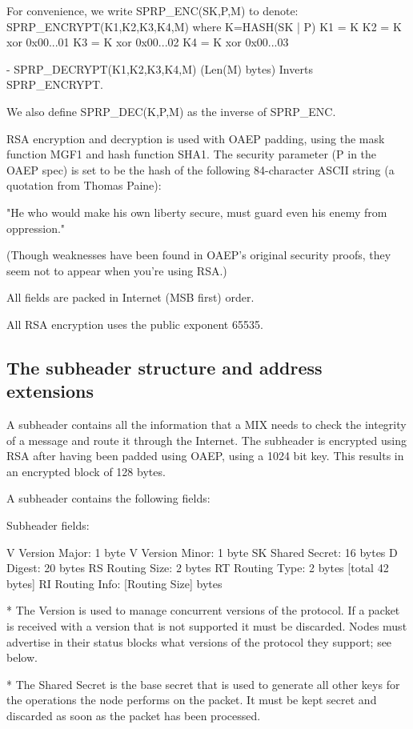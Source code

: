   For convenience, we write SPRP_ENC(SK,P,M) to denote:
       SPRP_ENCRYPT(K1,K2,K3,K4,M)
       where K=HASH(SK | P)
             K1 = K
             K2 = K xor 0x00...01
             K3 = K xor 0x00...02
             K4 = K xor 0x00...03

- SPRP_DECRYPT(K1,K2,K3,K4,M) (Len(M) bytes) Inverts SPRP_ENCRYPT.

  We also define SPRP_DEC(K,P,M) as the inverse of SPRP_ENC.

RSA encryption and decryption is used with OAEP padding, using the
mask function MGF1 and hash function SHA1.  The security parameter (P
in the OAEP spec) is set to be the hash of the following 84-character
ASCII string (a quotation from Thomas Paine):

     "He who would make his own liberty secure, must guard even his
      enemy from oppression." 

(Though weaknesses have been found in OAEP's original security proofs,
they seem not to appear when you're using RSA.)

All fields are packed in Internet (MSB first) order.

All RSA encryption uses the public exponent 65535.

\subsection{The subheader structure and address extensions}

A subheader contains all the information that a MIX needs to check the
integrity of a message and route it through the Internet. The subheader
is encrypted using RSA after having been padded using OAEP, using a 1024
bit key. This results in an encrypted block of 128 bytes.

A subheader contains the following fields:

Subheader fields:

V   Version Major:   1 byte
V   Version Minor:   1 byte
SK  Shared Secret:   16 bytes
D   Digest:          20 bytes
RS  Routing Size:    2 bytes 
RT  Routing Type:    2 bytes [total 42 bytes]
RI  Routing Info:    [Routing Size] bytes

* The Version is used to manage concurrent versions of the
protocol. If a packet is received with a version that is not supported
it must be discarded. Nodes must advertise in their status blocks what
versions of the protocol they support; see below.

* The Shared Secret is the base secret that is used to generate all
other keys for the operations the node performs on the packet. It must be
kept secret and discarded as soon as the packet has been processed. 

